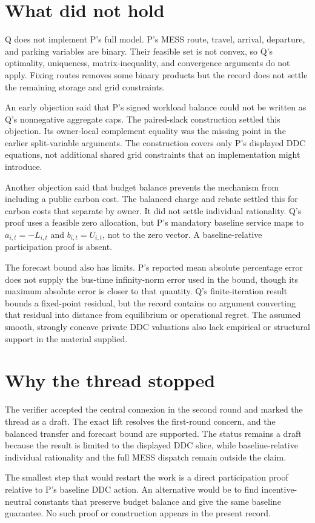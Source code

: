 \documentclass{article}
\begin{document}
\section{What did not hold}

Q does not implement P's full model.  P's MESS route, travel, arrival, departure, and parking variables are binary.  Their feasible set is not convex, so Q's optimality, uniqueness, matrix-inequality, and convergence arguments do not apply.  Fixing routes removes some binary products but the record does not settle the remaining storage and grid constraints.

An early objection said that P's signed workload balance could not be written as Q's nonnegative aggregate caps.  The paired-slack construction settled this objection.  Its owner-local complement equality was the missing point in the earlier split-variable arguments.  The construction covers only P's displayed DDC equations, not additional shared grid constraints that an implementation might introduce.

Another objection said that budget balance prevents the mechanism from including a public carbon cost.  The balanced charge and rebate settled this for carbon costs that separate by owner.  It did not settle individual rationality.  Q's proof uses a feasible zero allocation, but P's mandatory baseline service maps to \(a_{i,t}=-L_{i,t}\) and \(b_{i,t}=U_{i,t}\), not to the zero vector.  A baseline-relative participation proof is absent.

The forecast bound also has limits.  P's reported mean absolute percentage error does not supply the bus-time infinity-norm error used in the bound, though its maximum absolute error is closer to that quantity.  Q's finite-iteration result bounds a fixed-point residual, but the record contains no argument converting that residual into distance from equilibrium or operational regret.  The assumed smooth, strongly concave private DDC valuations also lack empirical or structural support in the material supplied.

\section{Why the thread stopped}

The verifier accepted the central connexion in the second round and marked the thread as a draft.  The exact lift resolves the first-round concern, and the balanced transfer and forecast bound are supported.  The status remains a draft because the result is limited to the displayed DDC slice, while baseline-relative individual rationality and the full MESS dispatch remain outside the claim.

The smallest step that would restart the work is a direct participation proof relative to P's baseline DDC action.  An alternative would be to find incentive-neutral constants that preserve budget balance and give the same baseline guarantee.  No such proof or construction appears in the present record.



\end{document}
